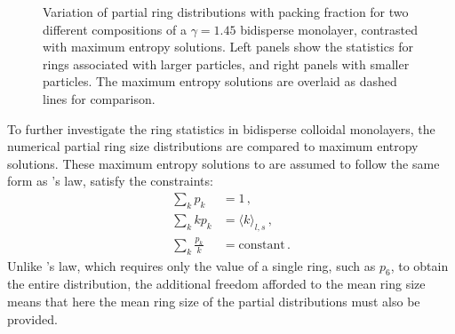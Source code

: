 \begin{figure}[bt]
     \caption{Variation of partial ring distributions with packing fraction for two different compositions of a $\gamma=1.45$ bidisperse monolayer, contrasted with maximum entropy solutions. Left panels show the statistics for rings associated with larger particles, and right panels with smaller particles. The maximum entropy solutions are overlaid as dashed lines for comparison.}
     \label{fig:bime}
\end{figure}

To further investigate the ring statistics in bidisperse colloidal monolayers, the numerical partial ring size distributions are compared to maximum entropy solutions.
These maximum entropy solutions to are assumed to follow the same form as \lm's law, \ie{} satisfy the constraints:
\begin{align}
	\sum_k p_k &= 1\,, \\
	\sum_k kp_k &= \langle k \rangle_{l,s}\,, \\
	\sum_k \frac{p_k}{k} &= \text{constant}\,.
\end{align}
Unlike \lm's law, which requires only the value of a single ring, such as $p_6$, to obtain the entire distribution, the additional freedom afforded to the mean ring size means that here the mean ring size of the partial distributions must also be provided.

